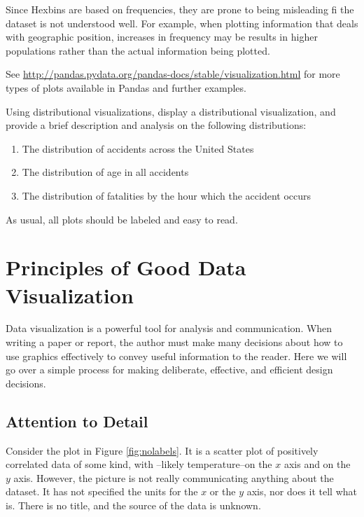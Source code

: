 \begin{info}
Since Hexbins are based on frequencies, they are prone to being misleading fi the dataset is not understood well. For example, when plotting information that deals with geographic position, increases in frequency may be results in higher populations rather than the actual information being plotted.

\end{info}

See \url{http://pandas.pydata.org/pandas-docs/stable/visualization.html} for more types of plots available in Pandas and further examples.

\begin{problem}
Using distributional visualizations, display a distributional visualization, and provide a brief description and analysis on the following distributions:
\begin{enumerate}
\item The distribution of accidents across the United States
\item The distribution of age in all accidents
\item The distribution of fatalities by the hour which the accident occurs
\end{enumerate}

As usual, all plots should be labeled and easy to read.
\end{problem}

\section*{Principles of Good Data Visualization} %

Data visualization is a powerful tool for analysis and communication.
When writing a paper or report, the author must make many decisions about how to use graphics effectively to convey useful information to the reader.
Here we will go over a simple process for making deliberate, effective, and efficient design decisions.

\subsection*{Attention to Detail} %

Consider the plot in Figure \ref{fig:nolabels}.
It is a scatter plot of positively correlated data of some kind, with --likely temperature--on the $x$ axis and  on the $y$ axis.
However, the picture is not really communicating anything about the dataset.
It has not specified the units for the $x$ or the $y$ axis, nor does it tell what  is. 
There is no title, and the source of the data is unknown.

